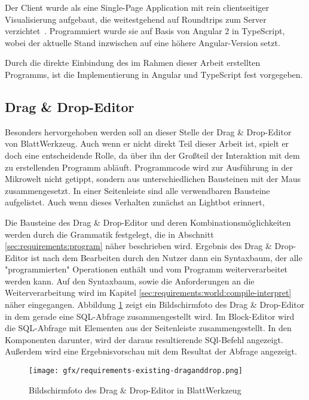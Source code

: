 Der Client wurde als eine Single-Page Application mit rein clientseitiger Visualisierung aufgebaut, die weitestgehend auf Roundtrips zum Server verzichtet~\cite[94-95]{riemer2016}. Programmiert wurde sie auf Basis von Angular 2 in TypeScript, wobei der aktuelle Stand inzwischen auf eine höhere Angular-Version setzt.

Durch die direkte Einbindung des im Rahmen dieser Arbeit erstellten Programms, ist die Implementierung in Angular und TypeScript fest vorgegeben.

\subsection{Drag \& Drop-Editor}
\label{sec:requirements:existing:structure:drag-drop}

Besonders hervorgehoben werden soll an dieser Stelle der Drag \& Drop-Editor von BlattWerkzeug. Auch wenn er nicht direkt Teil dieser Arbeit ist, spielt er doch eine entscheidende Rolle, da über ihn der Großteil der Interaktion mit dem zu erstellenden Programm abläuft. Programmcode wird zur Ausführung in der Mikrowelt nicht getippt, sondern aus unterschiedlichen Bausteinen mit der Maus zusammengesetzt. In einer Seitenleiste sind alle verwendbaren Bausteine aufgelistet. Auch wenn dieses Verhalten zunächst an Lightbot erinnert, 

Die Bausteine des Drag \& Drop-Editor und deren Kombinationsmöglichkeiten werden durch die Grammatik festgelegt, die in Abschnitt \ref{sec:requirements:program} näher beschrieben wird. Ergebnis des Drag \& Drop-Editor ist nach dem Bearbeiten durch den Nutzer dann ein Syntaxbaum, der alle "programmierten" Operationen enthält und vom Programm weiterverarbeitet werden kann. Auf den Syntaxbaum, sowie die Anforderungen an die Weiterverarbeitung wird im Kapitel \ref{sec:requirements:world:compile-interpret} näher eingegangen. Abbildung \ref{fig:requirements:existing:draganddrop} zeigt ein Bildschirmfoto des Drag \& Drop-Editor in dem gerade eine SQL-Abfrage zusammengestellt wird. Im Block-Editor wird die SQL-Abfrage mit Elementen aus der Seitenleiste zusammengestellt. In den Komponenten darunter, wird der daraus resultierende SQl-Befehl angezeigt. Außerdem wird eine Ergebnisvorschau mit dem Resultat der Abfrage angezeigt.

\begin{figure}
    \centering
    \texttt{[image: gfx/requirements-existing-draganddrop.png]}
    \caption{Bildschirmfoto des Drag \& Drop-Editor in BlattWerkzeug}
    \label{fig:requirements:existing:draganddrop}
\end{figure}


